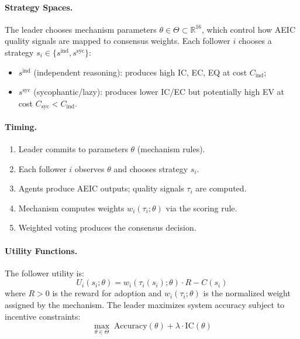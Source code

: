 \documentclass[runningheads]{llncs}
\begin{document}
\paragraph{Strategy Spaces.} The leader chooses mechanism parameters $\theta \in \Theta \subset \mathbb{R}^{16}$, which control how AEIC quality signals are mapped to consensus weights. Each follower $i$ chooses a strategy $s_i \in \{s^{\text{ind}}, s^{\text{syc}}\}$:
\begin{itemize}
    \item $s^{\text{ind}}$ (independent reasoning): produces high IC, EC, EQ at cost $C_{\text{ind}}$;
    \item $s^{\text{syc}}$ (sycophantic/lazy): produces lower IC/EC but potentially high EV at cost $C_{\text{syc}} < C_{\text{ind}}$.
\end{itemize}

\paragraph{Timing.}
\begin{enumerate}
    \item[(t=0)] Leader commits to parameters $\theta$ (mechanism rules).
    \item[(t=1)] Each follower $i$ observes $\theta$ and chooses strategy $s_i$.
    \item[(t=2)] Agents produce AEIC outputs; quality signals $\tau_i$ are computed.
    \item[(t=3)] Mechanism computes weights $w_i(\tau_i; \theta)$ via the scoring rule.
    \item[(t=4)] Weighted voting produces the consensus decision.
\end{enumerate}

\paragraph{Utility Functions.} The follower utility is:
\begin{equation}
    U_i(s_i; \theta) = w_i(\tau_i(s_i); \theta) \cdot R - C(s_i)
    \label{eq:follower_utility}
\end{equation}
where $R > 0$ is the reward for adoption and $w_i(\tau_i; \theta)$ is the normalized weight assigned by the mechanism. The leader maximizes system accuracy subject to incentive constraints:
\begin{equation}
    \max_{\theta \in \Theta} \; \text{Accuracy}(\theta) + \lambda \cdot \text{IC}(\theta)
    \label{eq:leader_obj}
\end{equation}
\end{document}
